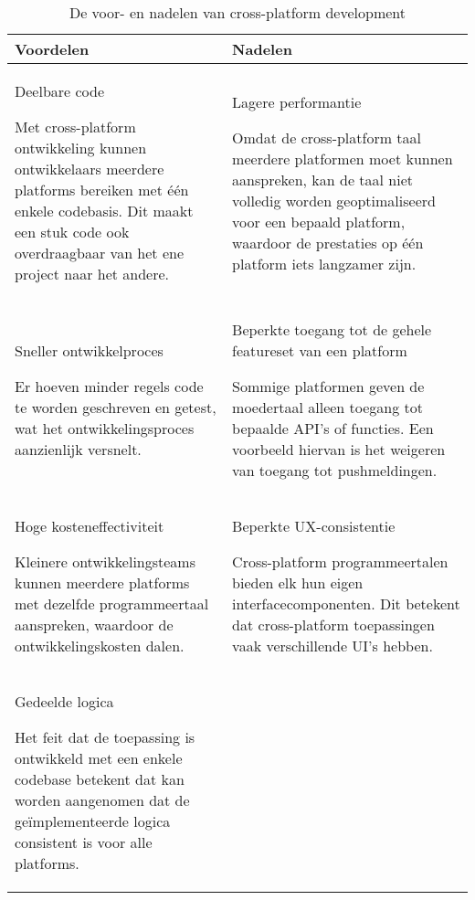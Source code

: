 \begin{table}[H]
    \centering
    \begin{tabular}{|p{3.0in}|p{3.0in}|}
        \hline
        Voordelen & Nadelen 
        \\
        \hline
        \hline
        Deelbare code
        
        Met cross-platform ontwikkeling kunnen ontwikkelaars meerdere platforms bereiken met één enkele codebasis. Dit maakt een stuk code ook overdraagbaar van het ene project naar het andere.
            &
        Lagere performantie
        
        Omdat de cross-platform taal meerdere platformen moet kunnen aanspreken, kan de taal niet volledig worden geoptimaliseerd voor een bepaald platform, waardoor de prestaties op één platform iets langzamer zijn.
        \\\hline
        Sneller ontwikkelproces
        
        Er hoeven minder regels code te worden geschreven en getest, wat het ontwikkelingsproces aanzienlijk versnelt.
            &
        Beperkte toegang tot de gehele featureset van een platform
        
        Sommige platformen geven de moedertaal alleen toegang tot bepaalde API's of functies.
        Een voorbeeld hiervan is het weigeren van toegang tot pushmeldingen.
        \\\hline
        Hoge kosteneffectiviteit
        
        Kleinere ontwikkelingsteams kunnen meerdere platforms met dezelfde programmeertaal aanspreken, waardoor de ontwikkelingskosten dalen.
        &
        Beperkte UX-consistentie
        
        Cross-platform programmeertalen bieden elk hun eigen interfacecomponenten. Dit betekent dat cross-platform toepassingen vaak verschillende UI's hebben.
        \\\hline
        Gedeelde logica
        
        Het feit dat de toepassing is ontwikkeld met een enkele codebase betekent dat kan worden aangenomen dat de geïmplementeerde logica consistent is voor alle platforms.
        
        &
        
        \\\hline
    \end{tabular}
    \caption{De voor- en nadelen van cross-platform development}
    \label{tab:crossPlatformDevelopmentTable}
\end{table}

